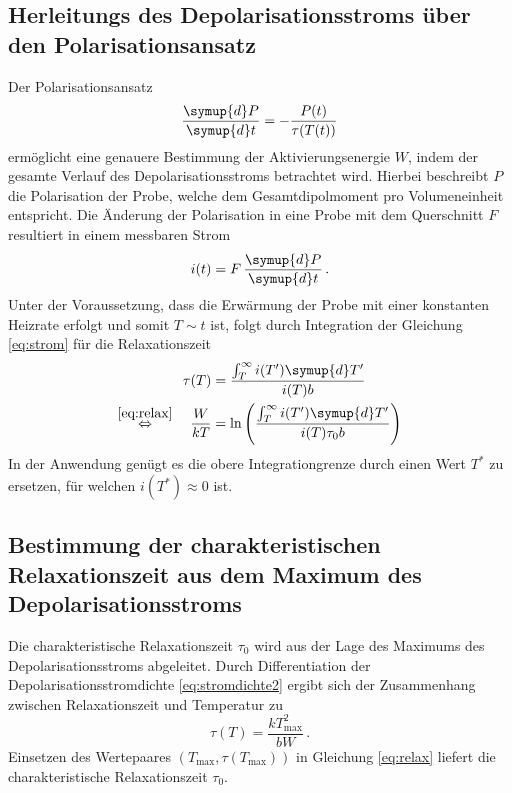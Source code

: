 \subsection*{Herleitungs des Depolarisationsstroms über den Polarisationsansatz}
Der Polarisationsansatz
\begin{equation}
    \frac{\symup{d}P}{\symup{d}t}=-\frac{P(t)}{\tau(T(t))}
\end{equation}
ermöglicht eine genauere Bestimmung der Aktivierungsenergie $W$, indem der gesamte Verlauf des Depolarisationsstroms betrachtet wird.
Hierbei beschreibt $P$ die Polarisation der Probe, welche dem Gesamtdipolmoment pro Volumeneinheit entspricht.
Die Änderung der Polarisation in eine Probe mit dem Querschnitt $F$ resultiert in einem messbaren Strom
\begin{equation}\label{eq:strom}
    i(t)=F\,\frac{\symup{d}P}{\symup{d}t} \, .
\end{equation}
Unter der Voraussetzung, dass die Erwärmung der Probe mit einer konstanten Heizrate erfolgt und somit $T\sim t$ ist, folgt durch Integration der Gleichung \eqref{eq:strom} für die Relaxationszeit
\begin{align}
    \tau(T)&= \frac{\int_T^\infty i(T')\symup{d}T'}{i(T)b}\\
    \stackrel{\eqref{eq:relax}}{\Leftrightarrow}\quad \frac{W}{kT} &= \ln \left(\frac{\int_T^\infty i(T')\symup{d}T'}{i(T)\tau_0 b}\right)
\end{align}
In der Anwendung genügt es die obere Integrationgrenze durch einen Wert $T^*$ zu ersetzen, für welchen $i(T^*)\approx 0$ ist.

\subsection*{Bestimmung der charakteristischen Relaxationszeit aus dem Maximum des Depolarisationsstroms}
Die charakteristische Relaxationszeit $\tau_0$ wird aus der Lage des Maximums des Depolarisationsstroms abgeleitet.
Durch Differentiation der Depolarisationsstromdichte \eqref{eq:stromdichte2} ergibt sich der Zusammenhang zwischen Relaxationszeit und Temperatur zu
\begin{equation}
    \tau(T)=\frac{kT_\text{max}^2}{bW} \,.
\end{equation}
Einsetzen des Wertepaares $(T_\text{max}, \tau(T_\text{max}))$ in Gleichung \eqref{eq:relax} liefert die charakteristische Relaxationszeit $\tau_0$.


